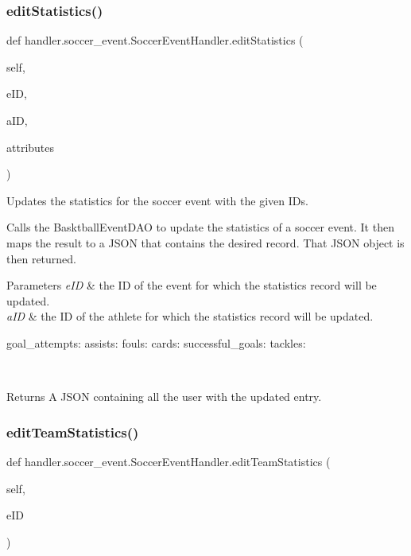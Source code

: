 \subsubsection{\texorpdfstring{edit\+Statistics()}{editStatistics()}}
{\footnotesize\ttfamily def handler.\+soccer\+\_\+event.\+Soccer\+Event\+Handler.\+edit\+Statistics (\begin{DoxyParamCaption}\item[{}]{self,  }\item[{}]{e\+ID,  }\item[{}]{a\+ID,  }\item[{}]{attributes }\end{DoxyParamCaption})}



Updates the statistics for the soccer event with the given I\+Ds. 

Calls the Basktball\+Event\+D\+AO to update the statistics of a soccer event. It then maps the result to a J\+S\+ON that contains the desired record. That J\+S\+ON object is then returned.


\begin{DoxyParams}{Parameters}
{\em e\+ID} & the ID of the event for which the statistics record will be updated. \\
\hline
{\em a\+ID} & the ID of the athlete for which the statistics record will be updated. \begin{DoxyVerb}           goal_attempts:
           assists:
           fouls:
           cards:
           successful_goals:
           tackles:
\end{DoxyVerb}
\\
\hline
\end{DoxyParams}
\begin{DoxyReturn}{Returns}
A J\+S\+ON containing all the user with the updated entry. 
\end{DoxyReturn}
\mbox{\label{classhandler_1_1soccer__event_1_1_soccer_event_handler_a72dada7cb3d2d6f6cbf0e6524a06b045}} 
\subsubsection{\texorpdfstring{edit\+Team\+Statistics()}{editTeamStatistics()}}
{\footnotesize\ttfamily def handler.\+soccer\+\_\+event.\+Soccer\+Event\+Handler.\+edit\+Team\+Statistics (\begin{DoxyParamCaption}\item[{}]{self,  }\item[{}]{e\+ID }\end{DoxyParamCaption})}



